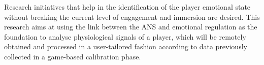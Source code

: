 Research initiatives that help in the identification of the player emotional state without breaking the current level of engagement and immersion are desired. This research aims at using the link between the ANS and emotional regulation as the foundation to analyse physiological signals of a player, which will be remotely obtained and processed in a user-tailored fashion according to data previously collected in a game-based calibration phase.
